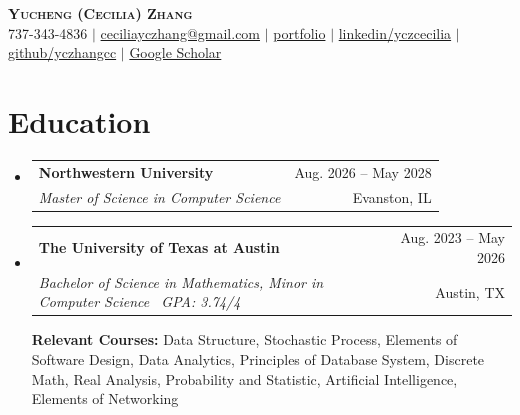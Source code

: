 \documentclass[letterpaper,11pt]{article}
\makeatletter
\newcommand{\resumeSubheading}[4]{
  \vspace{-4.3pt}\item
    \begin{tabular*}{0.97\textwidth}[t]{l@{\extracolsep{\fill}}r}
      \textbf{#1} & \small#2 \\
      \textit{\small#3} & \small#4 \\
    \end{tabular*}\vspace{-8pt}
}
\newcommand{\resumeSubHeadingListStart}{\begin{itemize}[leftmargin=0.15in, label={}]}
\newcommand{\resumeSubHeadingListEnd}{\end{itemize}}
\makeatother
\begin{document}
\begin{center}
    \textbf{\Large \scshape Yucheng (Cecilia) Zhang} \\ \vspace{1pt}
    \small 737-343-4836 $|$ 
    \href{mailto:ceciliayczhang@gmail.com}{ceciliayczhang@gmail.com} $|$ 
    \href{https://yuchengzhang-portfolio.vercel.app/}{portfolio} $|$
    \href{https://www.linkedin.com/in/yczcecilia/}{linkedin/yczcecilia} $|$
    \href{https://github.com/yczhangcc}{github/yczhangcc} $|$
    \href{https://scholar.google.com/citations?user=Stx_NRQAAAAJ&hl=en}{Google Scholar}
    
\end{center}

\section{Education}
 \resumeSubHeadingListStart
    \resumeSubheading
      {Northwestern University}{Aug. 2026 – May 2028}
      {Master of Science in Computer Science}{Evanston, IL}
      \resumeSubheading
      {The University of Texas at Austin}{Aug. 2023 – May 2026}
      {Bachelor of Science in Mathematics, Minor in Computer Science \textbar\ GPA: 3.74/4}{Austin, TX}
   \begin{minipage}[t]{\linewidth}
        \vspace{0.6em}
      \small\textbf{Relevant Courses:} Data Structure, Stochastic Process, Elements of Software Design, Data Analytics, Principles of Database System, Discrete Math, Real Analysis, Probability and Statistic, Artificial Intelligence, Elements of Networking
    \end{minipage}
\resumeSubHeadingListEnd

\end{document}
